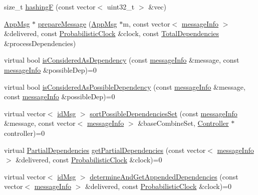 \begin{DoxyCompactItemize}
\item 
size\+\_\+t \hyperlink{class_hash_error_detector_aa0b6a85ef4078e4851cd56b612a539c5}{hashingF} (const vector$<$ uint32\+\_\+t $>$ \&vec)
\item 
\hyperlink{class_app_msg}{App\+Msg} $\ast$ \hyperlink{class_hash_error_detector_a2b1dad6a83a08fd7ce88e32f84638459}{prepare\+Message} (\hyperlink{class_app_msg}{App\+Msg} $\ast$m, const vector$<$ \hyperlink{structures_8h_a7e7bdc1d2fff8a9436f2f352b2711ed6}{message\+Info} $>$ \&delivered, const \hyperlink{class_probabilistic_clock}{Probabilistic\+Clock} \&clock, const \hyperlink{class_total_dependencies}{Total\+Dependencies} \&process\+Dependencies)
\item 
virtual bool \hyperlink{class_hash_error_detector_a4693d4d5e327b19f75088cef52bcad7d}{is\+Considered\+As\+Dependency} (const \hyperlink{structures_8h_a7e7bdc1d2fff8a9436f2f352b2711ed6}{message\+Info} \&message, const \hyperlink{structures_8h_a7e7bdc1d2fff8a9436f2f352b2711ed6}{message\+Info} \&possible\+Dep)=0
\item 
virtual bool \hyperlink{class_hash_error_detector_ac0a25b9c1e27f98223869d11ca46d18f}{is\+Considered\+As\+Possible\+Dependency} (const \hyperlink{structures_8h_a7e7bdc1d2fff8a9436f2f352b2711ed6}{message\+Info} \&message, const \hyperlink{structures_8h_a7e7bdc1d2fff8a9436f2f352b2711ed6}{message\+Info} \&possible\+Dep)=0
\item 
virtual vector$<$ \hyperlink{structures_8h_a83a1d9a070efa5341da84cfd8e28d3e5}{id\+Msg} $>$ \hyperlink{class_hash_error_detector_ad7419eaab728b7ed3e394d5aee9eda41}{sort\+Possible\+Dependencies\+Set} (const \hyperlink{structures_8h_a7e7bdc1d2fff8a9436f2f352b2711ed6}{message\+Info} \&message, const vector$<$ \hyperlink{structures_8h_a7e7bdc1d2fff8a9436f2f352b2711ed6}{message\+Info} $>$ \&base\+Combine\+Set, \hyperlink{class_controller}{Controller} $\ast$controller)=0
\item 
virtual \hyperlink{class_partial_dependencies}{Partial\+Dependencies} \hyperlink{class_hash_error_detector_a5b9f7e8a6f63b1582e912102021c2d8d}{get\+Partial\+Dependencies} (const vector$<$ \hyperlink{structures_8h_a7e7bdc1d2fff8a9436f2f352b2711ed6}{message\+Info} $>$ \&delivered, const \hyperlink{class_probabilistic_clock}{Probabilistic\+Clock} \&clock)=0
\item 
virtual vector$<$ \hyperlink{structures_8h_a83a1d9a070efa5341da84cfd8e28d3e5}{id\+Msg} $>$ \hyperlink{class_hash_error_detector_ae45353331e29b50a0aa2fc6dd540ed4e}{determine\+And\+Get\+Appended\+Dependencies} (const vector$<$ \hyperlink{structures_8h_a7e7bdc1d2fff8a9436f2f352b2711ed6}{message\+Info} $>$ \&delivered, const \hyperlink{class_probabilistic_clock}{Probabilistic\+Clock} \&clock)=0
\end{DoxyCompactItemize}
